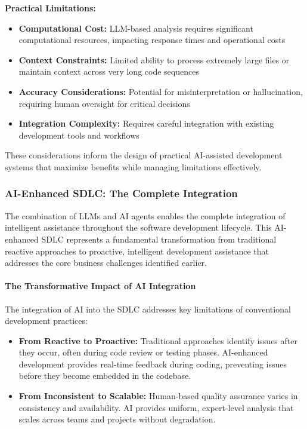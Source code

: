\begin{spacing}{1.2}
\textbf{Practical Limitations:}
\begin{itemize}
    \item \textbf{Computational Cost:} LLM-based analysis requires significant computational resources, impacting response times and operational costs
    \item \textbf{Context Constraints:} Limited ability to process extremely large files or maintain context across very long code sequences
    \item \textbf{Accuracy Considerations:} Potential for misinterpretation or hallucination, requiring human oversight for critical decisions
    \item \textbf{Integration Complexity:} Requires careful integration with existing development tools and workflows
\end{itemize}

These considerations inform the design of practical AI-assisted development systems that maximize benefits while managing limitations effectively.

\subsubsection*{AI-Enhanced SDLC: The Complete Integration}

The combination of LLMs and AI agents enables the complete integration of intelligent assistance throughout the software development lifecycle. This AI-enhanced SDLC represents a fundamental transformation from traditional reactive approaches to proactive, intelligent development assistance that addresses the core business challenges identified earlier.

\paragraph{The Transformative Impact of AI Integration}

The integration of AI into the SDLC addresses key limitations of conventional development practices:

\begin{itemize}
    \item \textbf{From Reactive to Proactive:} Traditional approaches identify issues after they occur, often during code review or testing phases. AI-enhanced development provides real-time feedback during coding, preventing issues before they become embedded in the codebase.
    
    \item \textbf{From Inconsistent to Scalable:} Human-based quality assurance varies in consistency and availability. AI provides uniform, expert-level analysis that scales across teams and projects without degradation.
    

\end{itemize}
\end{spacing}
